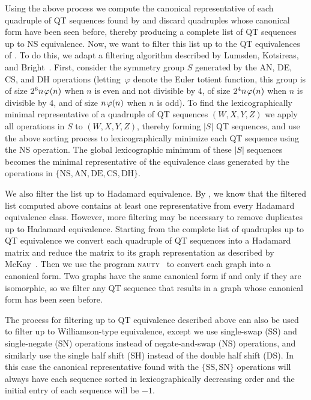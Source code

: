 \documentclass[12pt]{article}
\numberwithin{equation}{section}
\begin{document}
Using the above process we compute the canonical representative of each quadruple of QT sequences found by 
and discard quadruples whose canonical form have been seen before, thereby
producing a complete list of QT sequences up to NS equivalence.
Now, we want to filter this list up to the QT equivalences of .  To do this, we
adapt a filtering algorithm described by Lumsden, Kotsireas, and Bright~\cite[Alg.~7]{Lumsden2025}.  First, consider
the symmetry group $S$ generated by the AN, DE, CS, and DH operations (letting~$\varphi$
denote the Euler totient function, this group is of size $2^6n \mspace{1.5mu} \varphi(n)$ when $n$ is even
and not divisible by 4, of size $2^4n\mspace{1.5mu}\varphi(n)$ when $n$ is divisible by 4, and
of size $n \mspace{1.5mu} \varphi(n)$ when $n$ is odd).
To find the lexicographically minimal representative of a quadruple
of QT sequences $(W,X,Y,Z)$ we apply all operations in $S$ to $(W,X,Y,Z)$, thereby forming $|S|$ QT sequences,
and use the above sorting process to lexicographically minimize each QT sequence using the NS operation.
The global lexicographic minimum of these $|S|$ sequences becomes the minimal representative of the equivalence class
generated by the operations in $\{\text{NS},\text{AN},\text{DE},\text{CS},\text{DH}\}$.

We also filter the list up to Hadamard equivalence.
By , we know that the filtered list computed above
contains at least one representative from every Hadamard equivalence class.
However,
more filtering may be necessary to
remove duplicates up to Hadamard equivalence.
Starting from the complete list of quadruples
up to QT equivalence we convert each quadruple of QT sequences into a Hadamard matrix and reduce the matrix
to its graph representation as described by McKay~\cite{McKay1979}.  Then we use the program \textsc{nauty}~\cite{McKay2014}
to convert each graph into a canonical form.  Two graphs have the same canonical form if and only if they are
isomorphic, so we filter any QT sequence that results in a graph whose canonical form has been seen before.

The process for filtering up to QT equivalence described above can also be used to filter up to Williamson-type equivalence,
except we use single-swap (SS) and single-negate (SN) operations instead
of negate-and-swap (NS) operations, and similarly use the single half shift (SH)
instead of the double half shift (DS).  In this case the canonical representative found
with the $\{\text{SS},\text{SN}\}$ operations will always have each sequence sorted in lexicographically
decreasing order and the initial entry of each sequence will be $-1$.
\end{document}
